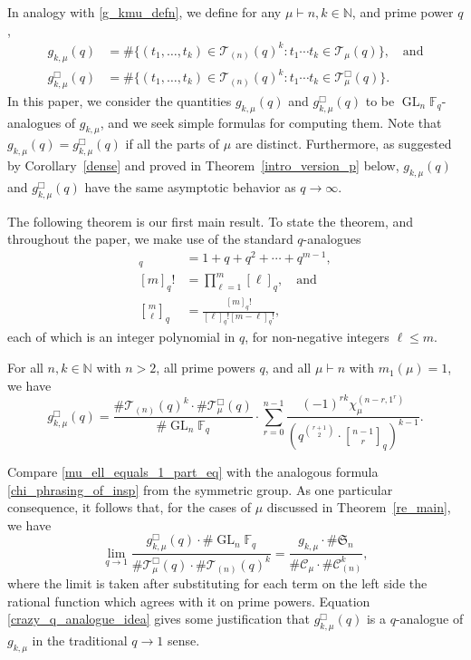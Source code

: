 \documentclass[Unicode,ALCO]{cedram}
\DeclareMathOperator{\GL}{GL}
\newcommand{\CC}{\mathcal{C}}
\newcommand{\F}{\mathbb{F}}
\newcommand{\N}{\mathbb{N}}
\newcommand{\FS}{\mathfrak{S}}
\newcommand{\CT}{\mathcal{T}}
\begin{document}
In analogy with \eqref{g_kmu_defn}, we define for any \(\mu \vdash n, k \in \N\), and prime power \(q\),
\begin{align*}
g_{k,\mu} (q)
& =
\# \{ (t_1,\ldots,t_k) \in \CT_{(n)} (q)^k : t_1 \cdots t_k \in \CT_\mu (q) \}, \quad \text{and} \\
g_{k,\mu}^\Box (q)
& =
\# \{ (t_1,\ldots,t_k) \in \CT_{(n)} (q)^k : t_1 \cdots t_k \in \CT_\mu^\Box (q) \}.
\end{align*}
In this paper, we consider the quantities \(g_{k,\mu}(q)\) and \(g_{k,\mu}^\Box (q)\) to be \(\GL_n \F_q\)-analogues of \(g_{k,\mu}\),
and we seek simple formulas for computing them.
Note that \(g_{k,\mu} (q) = g_{k,\mu}^\Box (q)\) if all the parts of \(\mu\) are distinct.
Furthermore, as suggested by Corollary~\ref{dense} and proved in Theorem~\ref{intro_version_p} below, \(g_{k,\mu} (q)\) and \(g_{k,\mu}^\Box (q)\) have the same asymptotic behavior as \(q \to \infty\).

The following theorem is our first main result.
To state the theorem, and throughout the paper, we make use of the standard \(q\)-analogues
\begin{align}
[m]_q  & = 1 + q + q^2 + \cdots + q^{m-1},
\label{x_analogue_of_n}\\
[m]_q! & = \prod_{\ell = 1}^{m} [\ell]_q, \quad \text{and}
\label{x_analogue_of_n_factorial}\\
{\genfrac[]{0pt}{1}{m}{\ell}}_q
& = \frac{[m]_q!}{[\ell]_q! [m-\ell]_q!},
\label{x_analogue_of_n_choose_k}
\end{align}
each of which is an integer polynomial in \(q\), for non-negative integers \(\ell \leq m\).


\begin{theorem}
\label{re_main}
For all \(n, k \in \N\) with \(n > 2\), all prime powers \(q\), and all \(\mu \vdash n\) with \(m_1(\mu) = 1\), we have
\begin{equation}
\label{mu_ell_equals_1_part_eq}
g_{k,\mu}^\Box(q)
=
\frac{\# \CT_{(n)} (q)^k
\cdot
\# \CT_\mu^\Box (q)}{\# \GL_n \F_q}
\cdot
\sum_{r=0}^{n-1}
\frac{(-1)^{rk} \chi^{(n-r,1^r)}_\mu}{\left ( q^{\binom{r+1}{2}} \cdot {\genfrac[]{0pt}{1}{n - 1}{r}}_{q} \right )^{k-1}}.
\end{equation}
\end{theorem}

Compare \eqref{mu_ell_equals_1_part_eq} with the analogous formula \eqref{chi_phrasing_of_insp} from the symmetric group.
As one particular consequence, it follows that, for the cases of \(\mu\) discussed in Theorem~\ref{re_main}, we have
\begin{equation}
\label{crazy_q_analogue_idea}
\lim_{q \to 1}
\frac{g_{k,\mu}^\Box (q) \cdot \# \GL_n \F_q }{\# \CT^\Box_\mu (q) \cdot \# \CT_{(n)} (q)^k }
=
\frac{g_{k,\mu} \cdot \# \FS_n}{\# \CC_\mu \cdot \# \CC_{(n)}^k},
\end{equation}
where the limit is taken after substituting for each term on the left side the rational function which agrees with it on prime powers.
Equation \eqref{crazy_q_analogue_idea} gives some justification that \(g_{k,\mu}^\Box (q)\) is a \(q\)-analogue of \(g_{k,\mu}\) in the traditional \(q \to 1\) sense.
\end{document}
